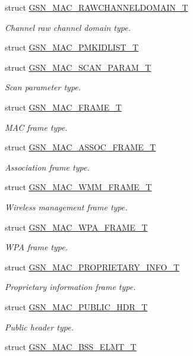 \begin{DoxyCompactItemize}
struct \hyperlink{a00127}{GSN\_\-MAC\_\-RAWCHANNELDOMAIN\_\-T}
\begin{DoxyCompactList}\small\item\em Channel raw channel domain type. \end{DoxyCompactList}\item 
struct \hyperlink{a00121}{GSN\_\-MAC\_\-PMKIDLIST\_\-T}
\item 
struct \hyperlink{a00130}{GSN\_\-MAC\_\-SCAN\_\-PARAM\_\-T}
\begin{DoxyCompactList}\small\item\em Scan parameter type. \end{DoxyCompactList}\item 
struct \hyperlink{a00116}{GSN\_\-MAC\_\-FRAME\_\-T}
\begin{DoxyCompactList}\small\item\em MAC frame type. \end{DoxyCompactList}\item 
struct \hyperlink{a00109}{GSN\_\-MAC\_\-ASSOC\_\-FRAME\_\-T}
\begin{DoxyCompactList}\small\item\em Association frame type. \end{DoxyCompactList}\item 
struct \hyperlink{a00136}{GSN\_\-MAC\_\-WMM\_\-FRAME\_\-T}
\begin{DoxyCompactList}\small\item\em Wireless management frame type. \end{DoxyCompactList}\item 
struct \hyperlink{a00137}{GSN\_\-MAC\_\-WPA\_\-FRAME\_\-T}
\begin{DoxyCompactList}\small\item\em WPA frame type. \end{DoxyCompactList}\item 
struct \hyperlink{a00123}{GSN\_\-MAC\_\-PROPRIETARY\_\-INFO\_\-T}
\begin{DoxyCompactList}\small\item\em Proprietary information frame type. \end{DoxyCompactList}\item 
struct \hyperlink{a00124}{GSN\_\-MAC\_\-PUBLIC\_\-HDR\_\-T}
\begin{DoxyCompactList}\small\item\em Public header type. \end{DoxyCompactList}\item 
struct \hyperlink{a00110}{GSN\_\-MAC\_\-BSS\_\-ELMT\_\-T}

\end{DoxyCompactItemize}
